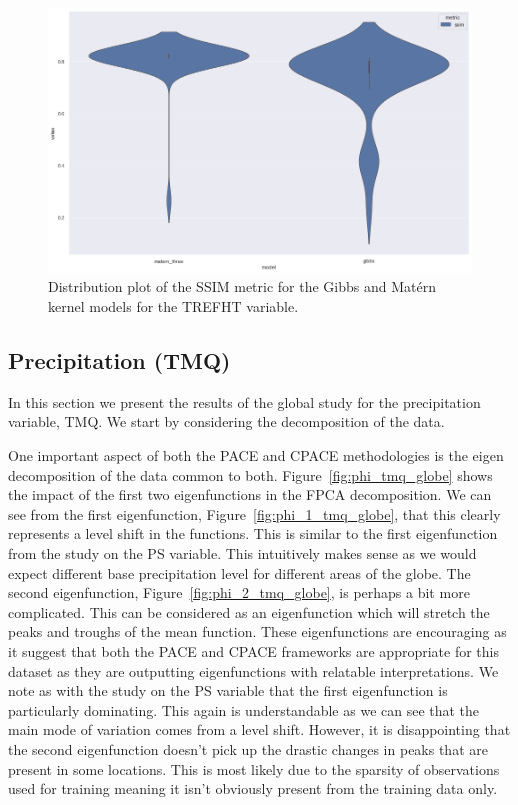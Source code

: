 \begin{figure}
	\centering
	\includegraphics[width=\textwidth]{cesm_trefht_dist}
	\caption[Distribution plot of the SSIM metric for the Gibbs and Mat\'ern kernel models for the TREFHT variable.]{Distribution plot of the SSIM metric for the Gibbs and Mat\'ern kernel models for the TREFHT variable.}
	\label{fig:cesm_trefht_dist}
\end{figure}

\subsection{Precipitation (TMQ) \label{ssec:cesm_tmq}}
In this section we present the results of the global study for the precipitation variable, TMQ.
We start by considering the decomposition of the data. 

One important aspect of both the PACE and CPACE methodologies is the eigen decomposition of the data common to both. 
Figure~\ref{fig:phi_tmq_globe} shows the impact of the first two eigenfunctions in the FPCA decomposition.
We can see from the first eigenfunction, Figure~\ref{fig:phi_1_tmq_globe}, that this clearly represents a level shift in the functions.
This is similar to the first eigenfunction from the study on the PS variable.
This intuitively makes sense as we would expect different base precipitation level for different areas of the globe.
The second eigenfunction, Figure~\ref{fig:phi_2_tmq_globe}, is perhaps a bit more complicated.
This can be considered as an eigenfunction which will stretch the peaks and troughs of the mean function.
These eigenfunctions are encouraging as it suggest that both the PACE and CPACE frameworks are appropriate for this dataset as they are outputting eigenfunctions with relatable interpretations.
We note as with the study on the PS variable that the first eigenfunction is particularly dominating.
This again is understandable as we can see that the main mode of variation comes from a level shift.
However, it is disappointing that the second eigenfunction doesn't pick up the drastic changes in peaks that are present in some locations. 
This is most likely due to the sparsity of observations used for training meaning it isn't obviously present from the training data only.


